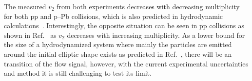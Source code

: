 The measured $v_{2}$ from both experiments decreases with decreasing multiplicity for both pp and p--Pb collisions, which is also predicted in hydrodynamic calculations~\cite{Weller:2017tsr,Taghavi:2019mqz}. Interestingly, the opposite situation can be seen in pp collisions as shown in Ref.~\cite{Schenke:2020mbo} as $v_2$ decreases with increasing multiplicity. 
As a lower bound for the size of a hydrodynamized
system where mainly the particles are emitted around the initial elliptic shape exists as predicted in Ref.~\cite{Taghavi:2019mqz}, there will be an transition of the flow signal, however, with the current experimental uncertainties and method it is still challenging to test its limit.

